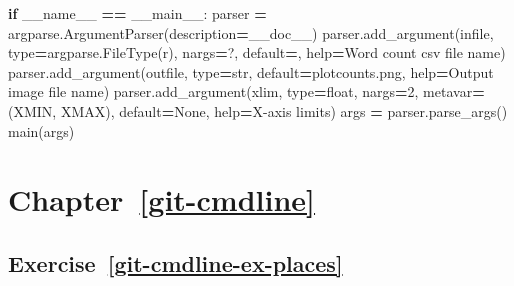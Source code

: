 \documentclass[
]{krantz}
\makeatletter
\newenvironment{Shaded}{\begin{snugshade}}{\end{snugshade}}
\newcommand{\BuiltInTok}[1]{#1}
\newcommand{\ControlFlowTok}[1]{\textcolor[rgb]{0.13,0.29,0.53}{\textbf{#1}}}
\newcommand{\DecValTok}[1]{\textcolor[rgb]{0.00,0.00,0.81}{#1}}
\newcommand{\NormalTok}[1]{#1}
\newcommand{\OperatorTok}[1]{\textcolor[rgb]{0.81,0.36,0.00}{\textbf{#1}}}
\newcommand{\StringTok}[1]{\textcolor[rgb]{0.31,0.60,0.02}{#1}}
\newcommand{\VariableTok}[1]{\textcolor[rgb]{0.00,0.00,0.00}{#1}}
\newenvironment{kframe}{%
\medskip{}
\setlength{\fboxsep}{.8em}
 \def\at@end@of@kframe{}%
 \ifinner\ifhmode%
  \def\at@end@of@kframe{\end{minipage}}%
  \begin{minipage}{\columnwidth}%
 \fi\fi%
 \def\FrameCommand##1{\hskip\@totalleftmargin \hskip-\fboxsep
 \colorbox{shadecolor}{##1}\hskip-\fboxsep
     \hskip-\linewidth \hskip-\@totalleftmargin \hskip\columnwidth}%
 \MakeFramed {\advance\hsize-\width
   \@totalleftmargin\z@ \linewidth\hsize
   \@setminipage}}%
 {\par\unskip\endMakeFramed%
 \at@end@of@kframe}
\renewenvironment{Shaded}{\begin{kframe}}{\end{kframe}}
\makeatother
\begin{document}
\begin{Shaded}
\begin{Highlighting}[]
\ControlFlowTok{if} \VariableTok{\_\_name\_\_} \OperatorTok{==} \StringTok{\textquotesingle{}\_\_main\_\_\textquotesingle{}}\NormalTok{:}
\NormalTok{    parser }\OperatorTok{=}\NormalTok{ argparse.ArgumentParser(description}\OperatorTok{=}\NormalTok{\_\_doc\_\_)}
\NormalTok{    parser.add\_argument(}\StringTok{\textquotesingle{}infile\textquotesingle{}}\NormalTok{, }\BuiltInTok{type}\OperatorTok{=}\NormalTok{argparse.FileType(}\StringTok{\textquotesingle{}r\textquotesingle{}}\NormalTok{), nargs}\OperatorTok{=}\StringTok{\textquotesingle{}?\textquotesingle{}}\NormalTok{,}
\NormalTok{                        default}\OperatorTok{=}\StringTok{\textquotesingle{}{-}\textquotesingle{}}\NormalTok{, }\BuiltInTok{help}\OperatorTok{=}\StringTok{\textquotesingle{}Word count csv file name\textquotesingle{}}\NormalTok{)}
\NormalTok{    parser.add\_argument(}\StringTok{\textquotesingle{}{-}{-}outfile\textquotesingle{}}\NormalTok{, }\BuiltInTok{type}\OperatorTok{=}\BuiltInTok{str}\NormalTok{, default}\OperatorTok{=}\StringTok{\textquotesingle{}plotcounts.png\textquotesingle{}}\NormalTok{,}
                        \BuiltInTok{help}\OperatorTok{=}\StringTok{\textquotesingle{}Output image file name\textquotesingle{}}\NormalTok{)}
\NormalTok{    parser.add\_argument(}\StringTok{\textquotesingle{}{-}{-}xlim\textquotesingle{}}\NormalTok{, }\BuiltInTok{type}\OperatorTok{=}\BuiltInTok{float}\NormalTok{, nargs}\OperatorTok{=}\DecValTok{2}\NormalTok{, metavar}\OperatorTok{=}\NormalTok{(}\StringTok{\textquotesingle{}XMIN\textquotesingle{}}\NormalTok{, }\StringTok{\textquotesingle{}XMAX\textquotesingle{}}\NormalTok{),}
\NormalTok{                        default}\OperatorTok{=}\VariableTok{None}\NormalTok{, }\BuiltInTok{help}\OperatorTok{=}\StringTok{\textquotesingle{}X{-}axis limits\textquotesingle{}}\NormalTok{)}
\NormalTok{    args }\OperatorTok{=}\NormalTok{ parser.parse\_args()}
\NormalTok{    main(args)}
\end{Highlighting}
\end{Shaded}

\hypertarget{chapter-refgit-cmdline}{%
\section*{Chapter~\ref{git-cmdline}}\label{chapter-refgit-cmdline}}

\hypertarget{exercise-refgit-cmdline-ex-places}{%
\subsection*{Exercise~\ref{git-cmdline-ex-places}}\label{exercise-refgit-cmdline-ex-places}}
\end{document}
